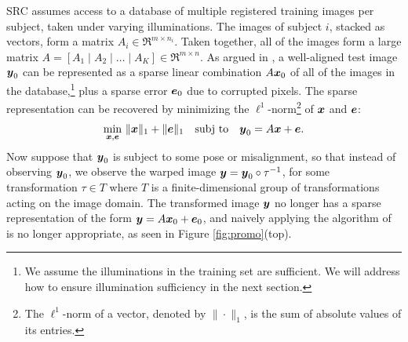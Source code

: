 \documentclass[12pt,journal,draftcls,letterpaper,onecolumn]{IEEEtran}
\newcommand{\subj}{\textup{subj to}}
\begin{document}
SRC assumes access to a database of multiple registered
training images per subject, taken under varying illuminations.
The images of subject $i$, stacked as vectors, form a matrix
$A_i \in \Re^{m \times n_i}$. Taken together, all of the images
form a large matrix $A = [ A_1 \mid A_2 \mid \dots \mid A_K ]
\in \Re^{m \times n}$. As argued in \cite{Wright2009-PAMI}, a
well-aligned test image ${\boldsymbol{y}}_0$ can be represented as a sparse
linear combination $A {\boldsymbol{x}}_0$ of all of the images in the
database,\footnote{We assume the illuminations in the training
set are sufficient. We will address how to ensure illumination
sufficiency in the next section.} plus a sparse error $\boldsymbol{e}_0$
due to corrupted pixels. The sparse representation can be recovered by
minimizing the $\ell^1$-norm\footnote{The $\ell^1$-norm of a
vector, denoted by $\|\cdot\|_1$, is the sum of absolute values of its entries.} of
${\boldsymbol{x}}$ and $\boldsymbol{e}$:
\begin{equation}
\min_{\x,\e} \, \| \x \|_1 + \| \e\|_1 \quad \subj \quad \y_0 = A \x + \e.
\label{eqn:robust-l1}
\end{equation}
Now suppose that ${\boldsymbol{y}}_0$ is subject to some pose or
misalignment, so that instead of observing ${\boldsymbol{y}}_0$, we observe
the warped image ${\boldsymbol{y}} = {\boldsymbol{y}}_0 \circ \tau^{-1}$, for some
transformation $\tau \in T$ where $T$ is a finite-dimensional
group of transformations acting on the image domain.  The
transformed image ${\boldsymbol{y}}$ no longer has a sparse representation of
the form ${\boldsymbol{y}} = A {\boldsymbol{x}}_0 + \boldsymbol{e}_0$, and naively applying the
algorithm of \cite{Wright2009-PAMI} is no longer appropriate,
as seen in Figure \ref{fig:promo}(top).
\end{document}

